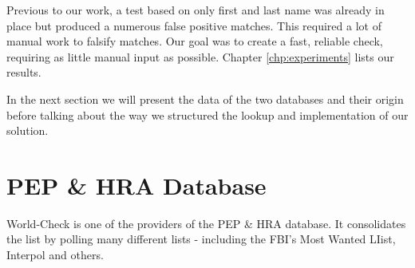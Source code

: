 \documentclass[a4paper, oneside]{csthesis}
\begin{document}
Previous to our work, a test based on only first and last name was already in place but produced a numerous false positive matches. This required a lot of manual work to falsify matches. Our goal was to create a fast, reliable check, requiring as little manual input as possible. Chapter \ref{chp:experiments} lists our results.

In the next section we will present the data of the two databases and their origin before talking about the way we structured the lookup and implementation of our solution.












\section{PEP \& HRA Database}


World-Check \cite{website:world-check} is one of the providers of the PEP \& HRA database. It consolidates the list by polling many different lists - including the FBI's Most Wanted LIist, Interpol and others.
\end{document}
